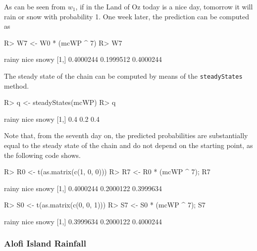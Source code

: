 \documentclass[
  nojss]{jss}
\begin{document}
As can be seen from \(w_{1}\), if in the Land of Oz today is a nice day, tomorrow it will rain or snow with probability 1. One week later, the prediction can be computed as

\begin{CodeChunk}
\begin{CodeInput}
R> W7 <- W0 * (mcWP ^ 7)
R> W7
\end{CodeInput}
\begin{CodeOutput}
         rainy      nice     snowy
[1,] 0.4000244 0.1999512 0.4000244
\end{CodeOutput}
\end{CodeChunk}

The steady state of the chain can be computed by means of the \texttt{steadyStates} method.

\begin{CodeChunk}
\begin{CodeInput}
R> q <- steadyStates(mcWP)
R> q
\end{CodeInput}
\begin{CodeOutput}
     rainy nice snowy
[1,]   0.4  0.2   0.4
\end{CodeOutput}
\end{CodeChunk}

Note that, from the seventh day on, the predicted probabilities are substantially equal to the steady state of the chain and do not depend on the starting point, as the following code shows.

\begin{CodeChunk}
\begin{CodeInput}
R> R0 <- t(as.matrix(c(1, 0, 0)))
R> R7 <- R0 * (mcWP ^ 7); R7
\end{CodeInput}
\begin{CodeOutput}
         rainy      nice     snowy
[1,] 0.4000244 0.2000122 0.3999634
\end{CodeOutput}
\begin{CodeInput}
R> S0 <- t(as.matrix(c(0, 0, 1)))
R> S7 <- S0 * (mcWP ^ 7); S7
\end{CodeInput}
\begin{CodeOutput}
         rainy      nice     snowy
[1,] 0.3999634 0.2000122 0.4000244
\end{CodeOutput}
\end{CodeChunk}

\subsubsection{Alofi Island Rainfall}\label{sec:wfAlofi}
\end{document}
